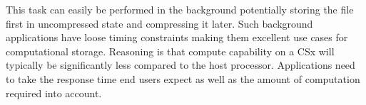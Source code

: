
This task can easily be performed in the background potentially storing the file
first in uncompressed state and compressing it later. Such background
applications have loose timing constraints making them excellent use cases for
computational storage. Reasoning is that compute capability on a CSx will
typically be significantly less compared to the host processor. Applications
need to take the response time end users expect as well as the amount of
computation required into account.




